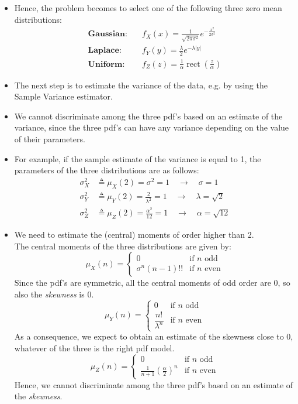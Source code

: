 \begin{itemize}
All the three distributions can model zero mean data by setting:
\[
\eta_X=\eta_Y=\eta_Z=0
\]
\item Hence, the problem becomes to select one of the following three zero mean distributions:
\[
\begin{aligned}
\textbf{Gaussian}: & \quad f_X(x) = \frac{1}{\sqrt{2\pi \sigma^2}} e^{-\frac{x^2}{2\sigma^2}} \\
\textbf{Laplace}: & \quad f_Y(y) = \frac{\lambda}{2} e^{-\lambda |y 
|} \\
\textbf{Uniform}: & \quad f_Z(z) = \frac{1}{\alpha} \operatorname{rect} \left(\frac{z}{\alpha}\right)
\end{aligned}
\]
\item The next step is to estimate the variance of the data, e.g. by using the Sample Variance estimator.

\item We cannot discriminate among the three pdf's based on an estimate of the variance, since the three pdf's can have any variance depending on the value of their parameters.
\item For example, if the sample estimate of the variance is equal to 1, the parameters of the three distributions are as follows:
\[
\begin{aligned}
\sigma_X^2 &\triangleq \mu_X(2) = \sigma^2 = 1 \quad \rightarrow \quad \sigma = 1 \\[1ex]
\sigma_Y^2 &\triangleq \mu_Y(2) = \frac{2}{\lambda^2} = 1 \quad \rightarrow \quad \lambda = \sqrt{2} \\[1ex]
\sigma_Z^2 &\triangleq \mu_Z(2) = \frac{\alpha^2}{12} = 1 \quad \rightarrow \quad \alpha = \sqrt{12}
\end{aligned}
\]
\item We need to estimate the (central) moments of order higher than 2.\\
\noindent The central moments of the three distributions are given by:
\[
\mu_X(n) =
\begin{cases}
0 & \text{if } n \text{ odd} \\
\sigma^n (n-1)!! & \text{if } n \text{ even}
\end{cases}
\]
\noindent Since the pdf's are symmetric, all the central moments of odd order are 0, so also the \textit{skewness} is 0.
\[
\mu_Y(n) =
\begin{cases}
0 & \text{if } n \text{ odd} \\
\dfrac{n!}{\lambda^n} & \text{if } n \text{ even}
\end{cases}
\]
\noindent As a consequence, we expect to obtain an estimate of the skewness close to 0, whatever of the three is the right pdf model.
\[
\mu_Z(n) =
\begin{cases}
0 & \text{if } n \text{ odd} \\
\frac{1}{n+1} \left(\frac{\alpha}{2}\right)^n & \text{if } n \text{ even}
\end{cases}
\]
\noindent Hence, we cannot discriminate among the three pdf's based on an estimate of the \textit{skewness}.


\end{itemize}
